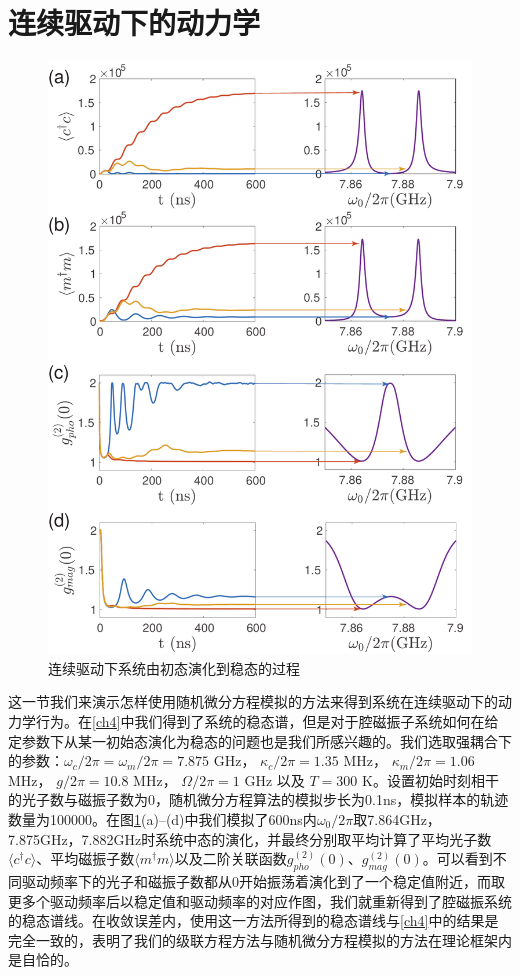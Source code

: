 \section{连续驱动下的动力学}
\begin{figure}[htbp]
	\centering
	\includegraphics[width=1.7\basefigurewidth,clip]{./figure/5_1}
	\caption{连续驱动下系统由初态演化到稳态的过程} 
	\label{ContinuiousDrive2edOrder}
\end{figure}
这一节我们来演示怎样使用随机微分方程模拟的方法来得到系统在连续驱动下的动力学行为。在\ref{ch4}中我们得到了系统的稳态谱，但是对于腔磁振子系统如何在给定参数下从某一初始态演化为稳态的问题也是我们所感兴趣的。我们选取强耦合下的参数：$\omega_c/2\pi=\omega_m/2\pi=7.875$ GHz， $\kappa_c/2\pi=1.35$ MHz， $\kappa_m/2\pi=1.06$ MHz， $g/2\pi=10.8$ MHz， $\Omega/2\pi=1$ GHz 以及 $T=300$ K。设置初始时刻相干的光子数与磁振子数为0，随机微分方程算法的模拟步长为0.1ns，模拟样本的轨迹数量为100000。在图\ref{ContinuiousDrive2edOrder}(a)--(d)中我们模拟了600ns内$\omega_0/2\pi$取7.864GHz，7.875GHz，7.882GHz时系统中态的演化，并最终分别取平均计算了平均光子数$\langle c^{\dag}c\rangle$、平均磁振子数$\langle m^{\dag}m\rangle$以及二阶关联函数$g_{pho}^{(2)}(0)$、$g_{mag}^{(2)}(0)$。可以看到不同驱动频率下的光子和磁振子数都从0开始振荡着演化到了一个稳定值附近，而取更多个驱动频率后以稳定值和驱动频率的对应作图，我们就重新得到了腔磁振系统的稳态谱线。在收敛误差内，使用这一方法所得到的稳态谱线与\ref{ch4}中的结果是完全一致的，表明了我们的级联方程方法与随机微分方程模拟的方法在理论框架内是自恰的。

